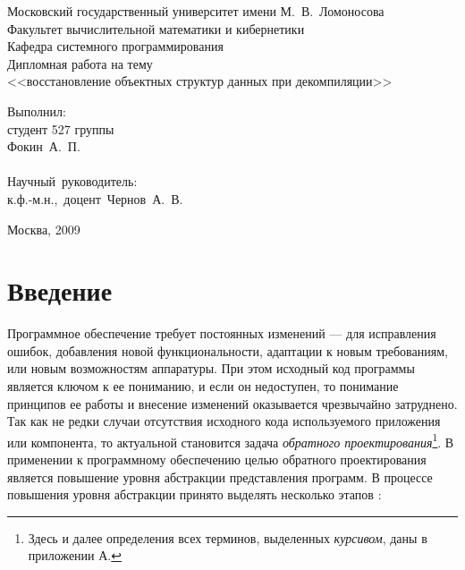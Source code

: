 \begin{titlepage}
    \begin{center}
	{\small \sc Московский государственный университет имени М.~В.~Ломоносова\\
	Факультет вычислительной математики и кибернетики\\
	Кафедра системного программирования\\}
	\vfill
	{\LARGE Дипломная работа на тему}\\
	{\Large <<восстановление объектных структур данных при декомпиляции>>}
    \end{center}
    \begin{flushright}
	\vfill {Выполнил:\\
	студент 527 группы\\
	Фокин~А.~П.\\
	~\\
	Научный~руководитель:\\
    к.ф.-м.н.,~доцент~Чернов~А.~В.
    }
    \end{flushright}
    \begin{center}
	\vfill
	{\small Москва, 2009}
    \end{center}
\end{titlepage}

\newpage
\begin{abstract}
В работе рассматриваются методы автоматического восстановления объектных структур данных из низкоуровневого представления программ на языке Си++.
\end{abstract}

\newpage
\tableofcontents

\newpage
\listoffigures

\newpage
\section*{Введение}
Программное обеспечение требует постоянных изменений --- для исправления ошибок, добавления новой функциональности, адаптации к новым требованиям, или новым возможностям аппаратуры. При этом исходный код программы является ключом к ее пониманию, и если он недоступен, то понимание принципов ее работы и внесение изменений оказывается чрезвычайно затруднено. Так как не редки случаи отсутствия исходного кода используемого приложения или компонента, то актуальной становится задача \textit{обратного проектирования}\footnote{Здесь и далее определения всех терминов, выделенных {\it курсивом}, даны в приложении А.}. В применении к программному обеспечению целью обратного проектирования является повышение уровня абстракции представления программ. В процессе повышения уровня абстракции принято выделять несколько этапов \cite{emmerik07}:

